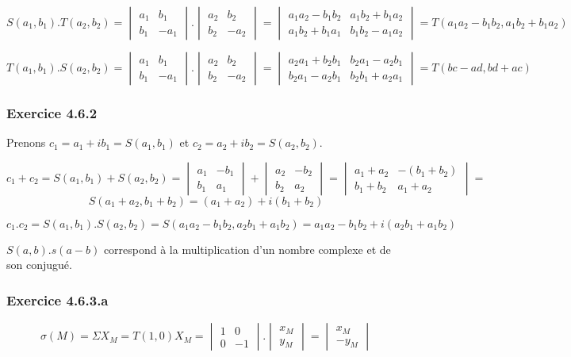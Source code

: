 \documentclass[]{book}
\theoremstyle{definition}
\begin{document}
$$
S(a_1,b_1).T(a_2,b_2) = 
\begin{vmatrix} a_1 & b_1 \\ b_1 & -a_1 \end{vmatrix}.\begin{vmatrix} a_2 & b_2 \\ b_2 & -a_2 \end{vmatrix} = 
\begin{vmatrix} a_1a_2-b_1b_2 & a_1b_2+b_1a_2 \\ a_1b_2+b_1a_1 & b_1b_2-a_1a_2 \end{vmatrix} = 
T(a_1a_2-b_1b_2,a_1b_2+b_1a_2)
$$

$$
T(a_1,b_1).S(a_2,b_2) = 
\begin{vmatrix} a_1 & b_1 \\ b_1 & -a_1 \end{vmatrix}.\begin{vmatrix} a_2 & b_2 \\ b_2 & -a_2 \end{vmatrix} = 
\begin{vmatrix} a_2a_1+b_2b_1 & b_2a_1-a_2b_1 \\ b_2a_1-a_2b_1 & b_2b_1+a_2a_1 \end{vmatrix} = 
T(bc-ad,bd+ac)
$$

\subsubsection*{Exercice 4.6.2}
Prenons $c_1 = a_1 + ib_1 = S(a_1, b_1)$ et $c_2 = a_2 + ib_2 = S(a_2, b_2)$.

$$c_1+c_2 = S(a_1,b_1) + S(a_2,b_2) =
\begin{vmatrix} a_1 & -b_1 \\ b_1 & a_1 \end{vmatrix} + \begin{vmatrix} a_2 & -b_2 \\ b_2 & a_2 \end{vmatrix} = 
\begin{vmatrix} a_1+a_2 & -(b_1+b_2) \\ b_1+b_2 & a_1+a_2 \end{vmatrix} =
$$
$$S(a_1+a_2,b_1+b_2) = (a_1+a_2) + i(b_1+b_2)$$

$$c_1.c_2 = S(a_1,b_1) . S(a_2,b_2) = S(a_1a_2-b_1b_2,a_2b_1+a_1b_2) = a_1a_2-b_1b_2 +i(a_2b_1+a_1b_2)$$

$S(a,b).s(a-b)$ correspond \`a la multiplication d'un nombre complexe et de son conjugu\'e.

\subsubsection*{Exercice 4.6.3.a}
$$\sigma(M) = \Sigma X_M = T(1,0) X_M = \begin{vmatrix} 1 & 0 \\ 0 & -1 \end{vmatrix} . \begin{vmatrix} x_M \\ y_M \end{vmatrix} =
\begin{vmatrix} x_M \\ -y_M \end{vmatrix}
$$
\end{document}
